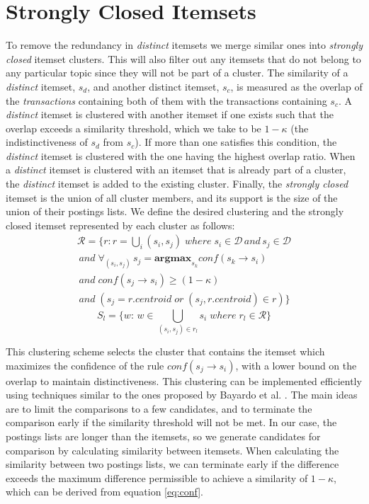 \documentclass[letterpaper,12pt,titlepage,oneside,final]{book}
\begin{document}
\section{Strongly Closed Itemsets}
To remove the redundancy in \emph{distinct} itemsets we merge similar ones
into \emph{strongly closed} itemset clusters.
This will also filter out any itemsets %
that do not belong to any particular topic
since they will not be part of a cluster.
The similarity of a \emph{distinct} itemset,
$s_d$, and another distinct itemset, $s_c$,
is measured as the overlap of the \emph{transactions} containing both of them
with the transactions containing $s_c$. 
A \emph{distinct} itemset is clustered with another itemset if one exists
such that the overlap exceeds a similarity threshold,
which we take to be $1-\kappa$ (the indistinctiveness of $s_d$ from $s_c$).
If more than one satisfies this condition,
the  \emph{distinct} itemset is clustered with the one having the highest
overlap ratio.
When  a \emph{distinct} itemset is clustered with an itemset that is already
part of a cluster, the \emph{distinct} itemset is added to the existing cluster.
Finally, the \emph{strongly closed} itemset is the union of all cluster members,
and its support is the size of the union of their postings lists.
We define the  desired clustering  and the strongly closed itemset
represented by each cluster as follows:
\begin{align*}\label{eq:strongClosedFormal}
\mathcal{R} = \{r: r = \bigcup_i{(s_i, s_j)}\; where\; s_i \in \mathcal{D} \, and \, s_j \in \mathcal{D} 
\\\,and\; \forall_{(s_i,s_j)} \, s_j = \textbf{argmax}_{s_k} conf(s_k \rightarrow s_i) \\\,and \;conf(s_j \rightarrow s_i) \ge (1-\kappa)
\\\, and\;( s_j = r.centroid\; or \; (s_j, r.centroid) \in r )\}
\end{align*}
\begin{equation}S_l = \{w:\, w \in \bigcup_{(s_i, s_j) \in r_l}{s_i} \; where \; r_l \in \mathcal{R}\}\end{equation}

This clustering scheme selects the cluster that contains the itemset which
maximizes the confidence of the rule $conf(s_j \rightarrow s_i)$,
with a lower bound on the overlap to maintain distinctiveness. 
This clustering can be implemented efficiently using techniques similar to
the ones proposed by Bayardo et al. \cite{bayardo2007scaling}.
The main ideas are to limit the comparisons to a few candidates,
and to terminate the comparison early if the similarity threshold will not
be met.
In our case, the postings lists are longer than the itemsets,
so we generate candidates for comparison by calculating similarity between
itemsets.
When calculating the similarity between two postings lists,
we can terminate early if the difference exceeds the maximum difference
permissible to achieve a similarity of $1-\kappa$,
which can be derived from equation \ref{eq:conf}. 
\end{document}
